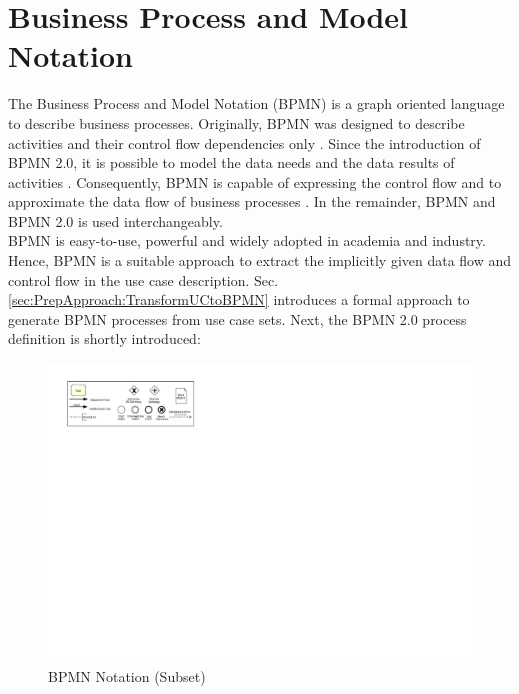 \section{Business Process and Model Notation}
\label{sec:PrepApproach:BPMN}
The Business Process and Model Notation (BPMN) is a graph oriented language to describe business processes. Originally, BPMN was designed to describe activities and their control flow dependencies only \cite{VisualizeBPMN}. Since the introduction of BPMN 2.0, it is possible to model the data needs and the data results of activities \cite{OMG}. Consequently, BPMN is capable of expressing the control flow and to approximate the data flow of business processes \cite{DataFlowErrorBPMN}. In the remainder, BPMN and BPMN 2.0 is used interchangeably. \\
BPMN is easy-to-use, powerful and widely adopted in academia and industry. Hence, BPMN is a suitable approach to extract the implicitly given data flow and control flow in the use case description. Sec.\ref{sec:PrepApproach:TransformUCtoBPMN} introduces a formal approach to generate BPMN processes from use case sets. Next, the BPMN 2.0 process definition is shortly introduced:

\begin{figure}[h!]
	\includegraphics[width=\textwidth, trim={1cm 16.8cm 19.5cm 1cm}]{img/Overview.pdf}
	\caption{BPMN Notation (Subset)}
	\label{fig:BPMNSubset}
\end{figure}

